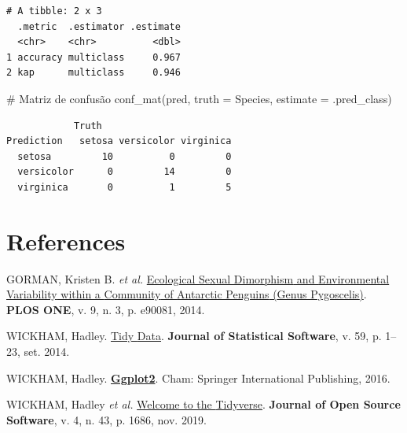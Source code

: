 \documentclass[
  12pt,
  letterpaper,
  DIV=11,
  numbers=noendperiod]{scrreprt}
\newenvironment{Shaded}{\begin{snugshade}}{\end{snugshade}}
\newcommand{\AttributeTok}[1]{\textcolor[rgb]{0.40,0.45,0.13}{#1}}
\newcommand{\CommentTok}[1]{\textcolor[rgb]{0.37,0.37,0.37}{#1}}
\newcommand{\FunctionTok}[1]{\textcolor[rgb]{0.28,0.35,0.67}{#1}}
\newcommand{\NormalTok}[1]{\textcolor[rgb]{0.00,0.23,0.31}{#1}}
\newlength{\cslhangindent}
\newenvironment{CSLReferences}[2] %
 {\begin{list}{}{%
  \setlength{\itemindent}{0pt}
  \setlength{\leftmargin}{0pt}
  \setlength{\parsep}{0pt}
  \ifodd #1
   \setlength{\leftmargin}{\cslhangindent}
   \setlength{\itemindent}{-1\cslhangindent}
  \fi
  \setlength{\itemsep}{#2\baselineskip}}}
 {\end{list}}
\theoremstyle{definition}
\theoremstyle{exemplo}
\begin{document}
\begin{verbatim}
# A tibble: 2 x 3
  .metric  .estimator .estimate
  <chr>    <chr>          <dbl>
1 accuracy multiclass     0.967
2 kap      multiclass     0.946
\end{verbatim}

\begin{Shaded}
\begin{Highlighting}[]
\CommentTok{\# Matriz de confusão}
\FunctionTok{conf\_mat}\NormalTok{(pred, }\AttributeTok{truth =}\NormalTok{ Species, }\AttributeTok{estimate =}\NormalTok{ .pred\_class)}
\end{Highlighting}
\end{Shaded}

\begin{verbatim}
            Truth
Prediction   setosa versicolor virginica
  setosa         10          0         0
  versicolor      0         14         0
  virginica       0          1         5
\end{verbatim}


\chapter*{References}\label{references}


\label{refs}
\begin{CSLReferences}{0}{1}
GORMAN, Kristen B. \emph{et al.}
\href{https://doi.org/10.1371/journal.pone.0090081}{Ecological {Sexual
Dimorphism} and {Environmental Variability} within a {Community} of
{Antarctic Penguins} ({Genus Pygoscelis})}. \textbf{PLOS ONE}, v. 9, n.
3, p. e90081, 2014.

WICKHAM, Hadley. \href{https://doi.org/10.18637/jss.v059.i10}{Tidy
{Data}}. \textbf{Journal of Statistical Software}, v. 59, p. 1--23, set.
2014.

WICKHAM, Hadley.
\textbf{\href{https://doi.org/10.1007/978-3-319-24277-4}{Ggplot2}}.
Cham: Springer International Publishing, 2016.

WICKHAM, Hadley \emph{et al.}
\href{https://doi.org/10.21105/joss.01686}{Welcome to the {Tidyverse}}.
\textbf{Journal of Open Source Software}, v. 4, n. 43, p. 1686, nov.
2019.

\end{CSLReferences}
\end{document}
